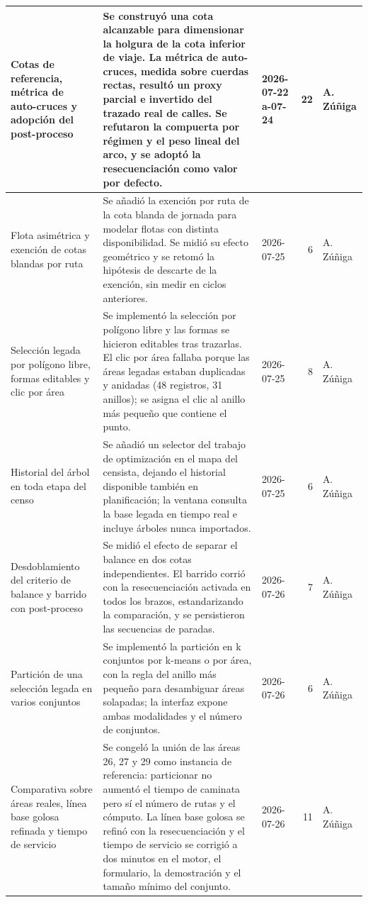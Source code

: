 \begin{xltabular}{\linewidth}{|p{3cm}|X|p{3cm}|r|l|}
\hline
Cotas de referencia, métrica de auto-cruces y adopción del post-proceso & Se construyó una cota alcanzable para dimensionar la holgura de la cota inferior de viaje. La métrica de auto-cruces, medida sobre cuerdas rectas, resultó un proxy parcial e invertido del trazado real de calles. Se refutaron la compuerta por régimen y el peso lineal del arco, y se adoptó la resecuenciación como valor por defecto. & 2026-07-22 a-07-24 & 22 & A. Zúñiga \\
\hline
Flota asimétrica y exención de cotas blandas por ruta & Se añadió la exención por ruta de la cota blanda de jornada para modelar flotas con distinta disponibilidad. Se midió su efecto geométrico y se retomó la hipótesis de descarte de la exención, sin medir en ciclos anteriores. & 2026-07-25 & 6 & A. Zúñiga \\
\hline
Selección legada por polígono libre, formas editables y clic por área & Se implementó la selección por polígono libre y las formas se hicieron editables tras trazarlas. El clic por área fallaba porque las áreas legadas estaban duplicadas y anidadas (48 registros, 31 anillos); se asigna el clic al anillo más pequeño que contiene el punto. & 2026-07-25 & 8 & A. Zúñiga \\
\hline
Historial del árbol en toda etapa del censo & Se añadió un selector del trabajo de optimización en el mapa del censista, dejando el historial disponible también en planificación; la ventana consulta la base legada en tiempo real e incluye árboles nunca importados. & 2026-07-25 & 6 & A. Zúñiga \\
\hline
Desdoblamiento del criterio de balance y barrido con post-proceso & Se midió el efecto de separar el balance en dos cotas independientes. El barrido corrió con la resecuenciación activada en todos los brazos, estandarizando la comparación, y se persistieron las secuencias de paradas. & 2026-07-26 & 7 & A. Zúñiga \\
\hline
Partición de una selección legada en varios conjuntos & Se implementó la partición en k conjuntos por k-means o por área, con la regla del anillo más pequeño para desambiguar áreas solapadas; la interfaz expone ambas modalidades y el número de conjuntos. & 2026-07-26 & 6 & A. Zúñiga \\
\hline
Comparativa sobre áreas reales, línea base golosa refinada y tiempo de servicio & Se congeló la unión de las áreas 26, 27 y 29 como instancia de referencia: particionar no aumentó el tiempo de caminata pero sí el número de rutas y el cómputo. La línea base golosa se refinó con la resecuenciación y el tiempo de servicio se corrigió a dos minutos en el motor, el formulario, la demostración y el tamaño mínimo del conjunto. & 2026-07-26 & 11 & A. Zúñiga \\

\end{xltabular}
